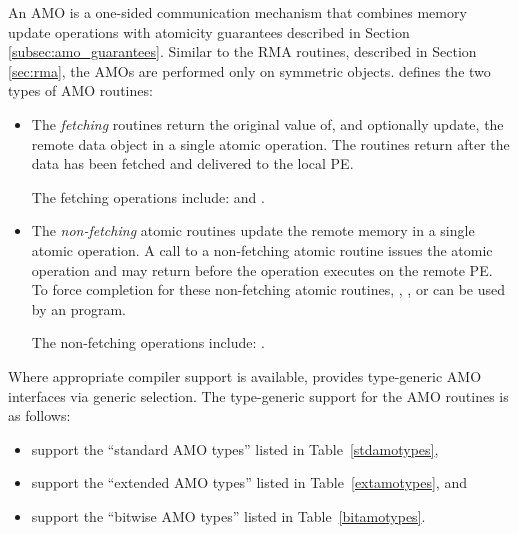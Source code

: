 An \ac{AMO} is a one-sided communication mechanism that combines memory update
operations with atomicity guarantees described in Section
\ref{subsec:amo_guarantees}.  Similar to the \ac{RMA} routines, described in
Section \ref{sec:rma}, the \acp{AMO} are performed only on symmetric objects.
\openshmem{} defines the two types of \ac{AMO} routines:
\begin{itemize}
\item
The \textit{fetching} routines return the original value of, and optionally
update, the remote data object in a single atomic operation.  The routines
return after the data has been fetched and delivered to the local \ac{PE}.

The fetching operations include:
 and
.

\item
The \textit{non-fetching} atomic routines update the remote memory in a single
atomic operation.  A call to a non-fetching atomic routine issues the atomic
operation and may return before the operation executes on the remote \ac{PE}.
To force completion for these non-fetching atomic routines,
, , or  can
be used by an \openshmem{} program.

The non-fetching operations include:
.
\end{itemize}

Where appropriate compiler support is available, \openshmem{} provides
type-generic \ac{AMO} interfaces via \Cstd[11] generic selection.
The type-generic support for the \ac{AMO} routines is as follows:

\begin{itemize}
\item {} support
      the ``standard \ac{AMO} types'' listed in Table~\ref{stdamotypes},
\item {} support
      the ``extended \ac{AMO} types'' listed in Table~\ref{extamotypes}, and
\item {}
      support the ``bitwise \ac{AMO} types'' listed in Table~\ref{bitamotypes}.
\end{itemize}

